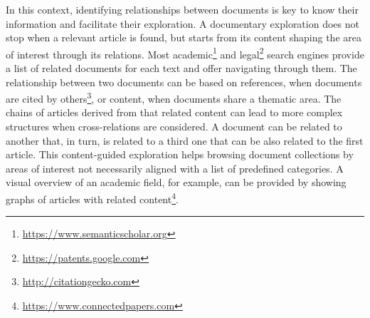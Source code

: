 In this context, identifying relationships between documents is key to know their information and facilitate their exploration. A documentary exploration does not stop when a relevant article is found, but starts from its content shaping the area of interest through its relations. Most academic\footnote{\url{https://www.semanticscholar.org}} and legal\footnote{\url{https://patents.google.com}} search engines provide a list of related documents for each text and offer navigating through them. The relationship between two documents can be based on references, when documents are cited by others\footnote{\url{http://citationgecko.com}}, or content, when documents share a thematic area. The chains of articles derived from that related content can lead to more complex structures when cross-relations are considered. A document can be related to another that, in turn, is related to a third one that can be also related to the first article. This content-guided exploration helps browsing document collections by areas of interest not necessarily aligned with a list of predefined categories. A visual overview of an academic field, for example, can be provided by showing graphs of articles with related content\footnote{\url{https://www.connectedpapers.com}}.

